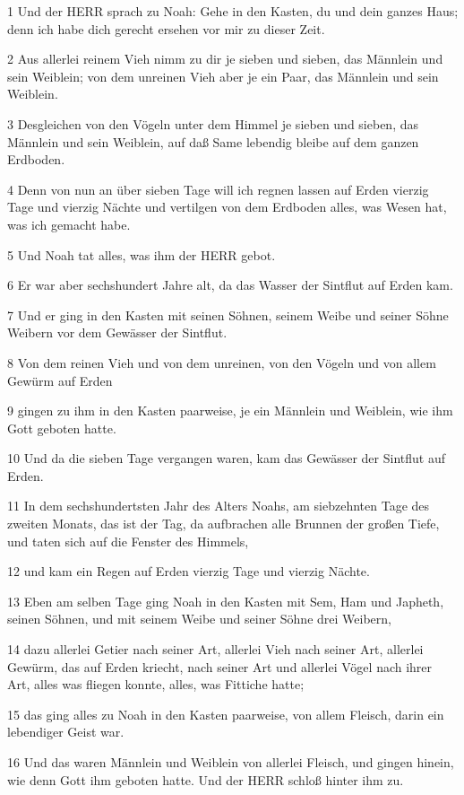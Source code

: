 \par 1 Und der HERR sprach zu Noah: Gehe in den Kasten, du und dein ganzes Haus; denn ich habe dich gerecht ersehen vor mir zu dieser Zeit.
\par 2 Aus allerlei reinem Vieh nimm zu dir je sieben und sieben, das Männlein und sein Weiblein; von dem unreinen Vieh aber je ein Paar, das Männlein und sein Weiblein.
\par 3 Desgleichen von den Vögeln unter dem Himmel je sieben und sieben, das Männlein und sein Weiblein, auf daß Same lebendig bleibe auf dem ganzen Erdboden.
\par 4 Denn von nun an über sieben Tage will ich regnen lassen auf Erden vierzig Tage und vierzig Nächte und vertilgen von dem Erdboden alles, was Wesen hat, was ich gemacht habe.
\par 5 Und Noah tat alles, was ihm der HERR gebot.
\par 6 Er war aber sechshundert Jahre alt, da das Wasser der Sintflut auf Erden kam.
\par 7 Und er ging in den Kasten mit seinen Söhnen, seinem Weibe und seiner Söhne Weibern vor dem Gewässer der Sintflut.
\par 8 Von dem reinen Vieh und von dem unreinen, von den Vögeln und von allem Gewürm auf Erden
\par 9 gingen zu ihm in den Kasten paarweise, je ein Männlein und Weiblein, wie ihm Gott geboten hatte.
\par 10 Und da die sieben Tage vergangen waren, kam das Gewässer der Sintflut auf Erden.
\par 11 In dem sechshundertsten Jahr des Alters Noahs, am siebzehnten Tage des zweiten Monats, das ist der Tag, da aufbrachen alle Brunnen der großen Tiefe, und taten sich auf die Fenster des Himmels,
\par 12 und kam ein Regen auf Erden vierzig Tage und vierzig Nächte.
\par 13 Eben am selben Tage ging Noah in den Kasten mit Sem, Ham und Japheth, seinen Söhnen, und mit seinem Weibe und seiner Söhne drei Weibern,
\par 14 dazu allerlei Getier nach seiner Art, allerlei Vieh nach seiner Art, allerlei Gewürm, das auf Erden kriecht, nach seiner Art und allerlei Vögel nach ihrer Art, alles was fliegen konnte, alles, was Fittiche hatte;
\par 15 das ging alles zu Noah in den Kasten paarweise, von allem Fleisch, darin ein lebendiger Geist war.
\par 16 Und das waren Männlein und Weiblein von allerlei Fleisch, und gingen hinein, wie denn Gott ihm geboten hatte. Und der HERR schloß hinter ihm zu.
